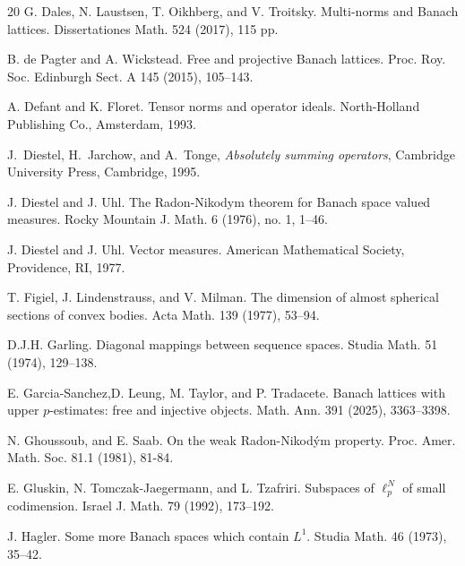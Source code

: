 \documentclass{amsart}
\theoremstyle{plain}
\theoremstyle{definition}
\numberwithin{equation}{section}
\begin{document}
\begin{thebibliography}{20}
 G. Dales, N. Laustsen, T. Oikhberg, and V. Troitsky.
Multi-norms and Banach lattices.
Dissertationes Math.   524 (2017), 115 pp.

 B. de Pagter and A. Wickstead.
Free and projective Banach lattices.
Proc. Roy. Soc. Edinburgh Sect. A 145 (2015), 105--143.

 A. Defant and K. Floret.
Tensor norms and operator ideals.  %
North-Holland Publishing Co., Amsterdam, 1993. %

J.~Diestel, H.~Jarchow, and A.~Tonge, \emph{Absolutely summing operators},
Cambridge University Press, Cambridge, 1995. %

 J. Diestel and J. Uhl. 
The Radon-Nikodym theorem for Banach space valued measures.
Rocky Mountain J. Math.   6 (1976), no. 1, 1–46.

 J. Diestel and J. Uhl. Vector measures.%
American Mathematical Society, Providence, RI, 1977. %


 T. Figiel, J. Lindenstrauss, and V. Milman.
The dimension of almost spherical sections of convex bodies.
Acta Math. 139 (1977), 53--94.

 D.J.H. Garling.
Diagonal mappings between sequence spaces.
Studia Math. 51 (1974), 129--138.

 E. Garcia-Sanchez,D. Leung, M. Taylor, and P. Tradacete.
Banach lattices with upper $p$-estimates: free and injective objects.
Math. Ann. 391 (2025), 3363--3398.


 N. Ghoussoub, and E. Saab. On the weak Radon-Nikod\'ym property. Proc. Amer. Math. Soc. 81.1 (1981), 81-84.

 E. Gluskin, N. Tomczak-Jaegermann, and L. Tzafriri.
Subspaces of $\ell^N_p$ of small codimension.
Israel J. Math. 79 (1992), 173--192.


 J. Hagler. Some more Banach spaces which contain $L^1$. Studia Math. 46 (1973), 35--42.


\end{thebibliography}
\end{document}
